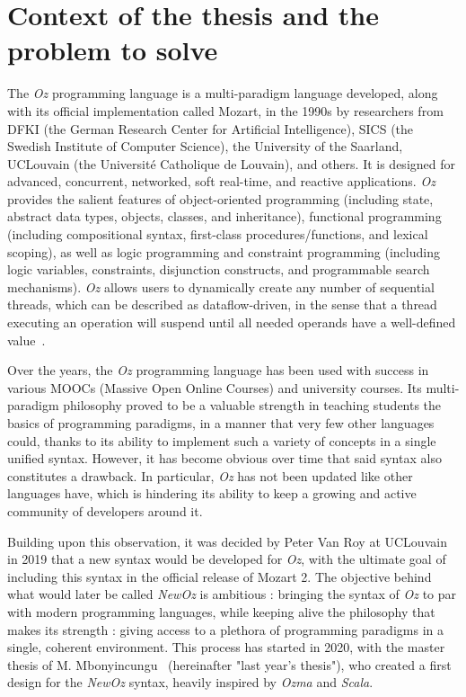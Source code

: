 \section{Context of the thesis and the problem to solve}\label{sec:ch1-context}
The \textit{Oz} programming language is a multi-paradigm language developed, along with its official implementation called Mozart, in the 1990s by researchers from DFKI (the German Research Center for Artificial Intelligence), SICS (the Swedish Institute of Computer Science), the University of the Saarland, UCLouvain (the Université Catholique de Louvain), and others.
It is designed for advanced, concurrent, networked, soft real-time, and reactive applications.
\textit{Oz} provides the salient features of object-oriented programming (including state, abstract data types, objects, classes, and inheritance),
functional programming (including compositional syntax, first-class procedures/functions, and lexical scoping), as well as
logic programming and constraint programming (including logic variables, constraints, disjunction constructs, and programmable search mechanisms).
\textit{Oz} allows users to dynamically create any number of sequential threads, which can be described as dataflow-driven, in the sense that a thread executing an operation will suspend until all needed operands have a well-defined value~\cite{mozart2tutorial}.\newline

Over the years, the \textit{Oz} programming language has been used with success in various MOOCs (Massive Open Online Courses) and university courses.
Its multi-paradigm philosophy proved to be a valuable strength in teaching students the basics of programming paradigms, in a manner that very few other languages could, thanks to its ability to implement such a variety of concepts in a single unified syntax.
However, it has become obvious over time that said syntax also constitutes a drawback.
In particular, \textit{Oz} has not been updated like other languages have, which is hindering its ability to keep a growing and active community of developers around it.\newline

Building upon this observation, it was decided by Peter Van Roy at UCLouvain in 2019 that a new syntax would be developed for \textit{Oz}, with the ultimate goal of including this syntax in the official release of Mozart 2.
The objective behind what would later be called \textit{NewOz} is ambitious : bringing the syntax of \textit{Oz} to par with modern programming languages, while keeping alive the philosophy that makes its strength : giving access to a plethora of programming paradigms in a single, coherent environment.
This process has started in 2020, with the master thesis of M. Mbonyincungu~\cite{jpthesis} (hereinafter "last year's thesis"), who created a first design for the \textit{NewOz} syntax, heavily inspired by \textit{Ozma} and \textit{Scala}.\newline

